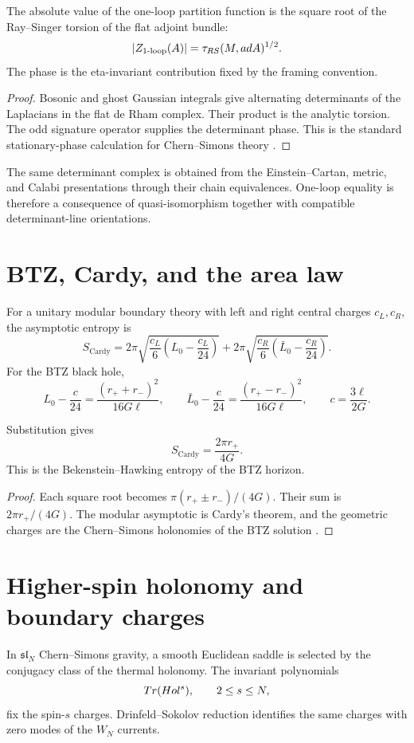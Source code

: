 \begin{theorem}
The absolute value of the one-loop partition function is the square root of the Ray--Singer torsion of the flat adjoint bundle:
\[
 |Z_{1\text{-loop}}(A)|
 =\tau_{RS}(M,adA)^{1/2}.
\]
The phase is the eta-invariant contribution fixed by the framing convention.
\end{theorem}
\begin{proof}
Bosonic and ghost Gaussian integrals give alternating determinants of the Laplacians in the flat de Rham complex.  Their product is the analytic torsion.  The odd signature operator supplies the determinant phase.  This is the standard stationary-phase calculation for Chern--Simons theory \cite{RaySinger1971,Witten3DGravity}.
\end{proof}

The same determinant complex is obtained from the Einstein--Cartan, metric, and Calabi presentations through their chain equivalences.  One-loop equality is therefore a consequence of quasi-isomorphism together with compatible determinant-line orientations.

\chapter{BTZ, Cardy, and the area law}
For a unitary modular boundary theory with left and right central charges $c_L,c_R$, the asymptotic entropy is
\[
 S_{\mathrm{Cardy}}
 =2\pi\sqrt{\frac{c_L}{6}\left(L_0-\frac{c_L}{24}\right)}
 +2\pi\sqrt{\frac{c_R}{6}\left(\bar L_0-\frac{c_R}{24}\right)}.
\]
For the BTZ black hole,
\[
 L_0-\frac c{24}=\frac{(r_++r_-)^2}{16G\ell},
 \qquad
 \bar L_0-\frac c{24}=\frac{(r_+-r_-)^2}{16G\ell},
 \qquad
 c=\frac{3\ell}{2G}.
\]

\begin{theorem}
Substitution gives
\[
 S_{\mathrm{Cardy}}=\frac{2\pi r_+}{4G}.
\]
This is the Bekenstein--Hawking entropy of the BTZ horizon.
\end{theorem}
\begin{proof}
Each square root becomes $\pi(r_+\pm r_-)/(4G)$.  Their sum is $2\pi r_+/(4G)$.  The modular asymptotic is Cardy's theorem, and the geometric charges are the Chern--Simons holonomies of the BTZ solution \cite{Cardy1986,BTZ1992}.
\end{proof}

\chapter{Higher-spin holonomy and boundary charges}
In $\mathfrak{sl}_N$ Chern--Simons gravity, a smooth Euclidean saddle is selected by the conjugacy class of the thermal holonomy.  The invariant polynomials
\[
 Tr(Hol^s),
 \qquad 2\le s\le N,
\]
fix the spin-$s$ charges.  Drinfeld--Sokolov reduction identifies the same charges with zero modes of the $W_N$ currents.

